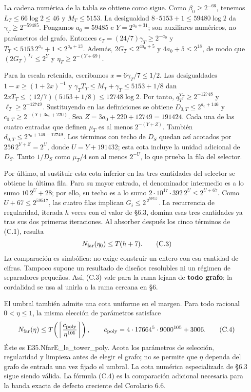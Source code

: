\documentclass[spanish,11pt,a4paper]{article}
\begin{document}
La cadena numérica de la tabla se obtiene como sigue. Como \(\beta_0\ge2^{-66}\), tenemos \(L_T\le66\log2\le46\) y \(M_T\le5153\). La desigualdad \(8\cdot5153+1\le59480\log2\) da \(\gamma_T\ge2^{-59485}\). Pongamos \(a_0=59485\) e \(Y=2^{a_0+31}\); son auxiliares numéricos, no parámetros del grafo. Entonces \(\epsilon_T=(24/7)\gamma_T\ge2^{-a_0}\) y \(T_T\le5153\,2^{a_0}+1\le2^{a_0+13}\). Además, \(2G_T\le2^{4a_0+5}\) y \(4a_0+5\le2^{18}\), de modo que \((2G_T)^{T_T}\le2^Y\) y \(\eta_T\ge2^{-(Y+69)}\).

Para la escala retenida, escribamos \(x=6\gamma_T/7\le1/2\). Las desigualdades \(1-x\ge(1+2x)^{-1}\) y \(\gamma_TT_T\le M_T+\gamma_T\le5153+1/8\) dan \(2xT_T\le(12/7)(5153+1/8)\le12748\log2\). Por tanto, \(q_T^{T_T}\ge2^{-12748}\) y \(\ell_T\ge2^{-12749}\). Sustituyendo en las definiciones se obtiene \(D_{0,T}\le2^{a_0+146}\) y \(c_{0,T}\ge2^{-(Y+3a_0+220)}\). Sea \(Z=3a_0+220+12749=191424\). Cada una de las cuatro entradas que definen \(\mu_T\) es al menos \(2^{-(Y+Z)}\). También \(d_{0,T}\le2^{a_0+146+12749}\). Los términos con techo de \(D_S\) quedan así acotados por \(256\,2^{Y+Z}=2^U\), donde \(U=Y+191432\); esta cota incluye la unidad adicional de \(D_S\). Tanto \(1/D_S\) como \(\mu_T/4\) son al menos \(2^{-U}\), lo que prueba la fila del selector.

Por último, al sustituir esta cota inferior en las tres cantidades del selector se obtiene la última fila. Para su mayor entrada, el denominador intermedio es a lo sumo \(10\,2^U+28\); por ello, su techo es a lo sumo \(2\cdot10^{17}\cdot392\,2^U\le2^{U+67}\). Como \(U+67\le2^{59517}\), las cuatro filas implican \(G_i\le2^{\,2^{59517}}\). La recurrencia de regularidad, iterada \(h\) veces con el valor de §6.3, domina esas tres cantidades ya tras sus dos primeras iteraciones. Al absorber después los cinco términos de (C.1), resulta \[
N_{\rm far}(\eta_0)\le T(h+7).
\tag{C.3}
\] La comparación es simbólica: no exige construir un entero con esa cantidad de cifras. Tampoco supone un resultado de diseños resolubles ni un régimen de separadores pequeños. Así, (C.3) vale para la rama lejana de \textbf{todo grafo}; la cordalidad se usa al unirla a la rama cercana en §6.

El umbral también admite una cota uniforme en el margen. Para todo racional \(0<\eta\le1\), la misma elección de parámetros satisface \[
N_{\rm far}(\eta)\le
T\!\left(\left\lceil\frac{c_{\rm poly}}{\eta^{105}}\right\rceil\right),
\qquad c_{\rm poly}=4\cdot17664^5\cdot9000^{105}+3006.
\tag{C.4}
\] Éste es {\ttfamily\small E35.\discretionary{\hbox{\ensuremath{\hookrightarrow}}}{}{}NfarE\_\discretionary{\hbox{\ensuremath{\hookrightarrow}}}{}{}le\_\discretionary{\hbox{\ensuremath{\hookrightarrow}}}{}{}tower\_\discretionary{\hbox{\ensuremath{\hookrightarrow}}}{}{}poly}. Acota los parámetros de selección, regularidad y limpieza antes de elegir el grafo; no se permite que \(\eta\) dependa del grafo de entrada una vez fijado el umbral. La cota numérica especializada de §6.3 sigue siendo válida. La fórmula (C.4) es la comparación adicional necesaria para la banda exacta de defecto creciente del Corolario 6.6.
\end{document}
